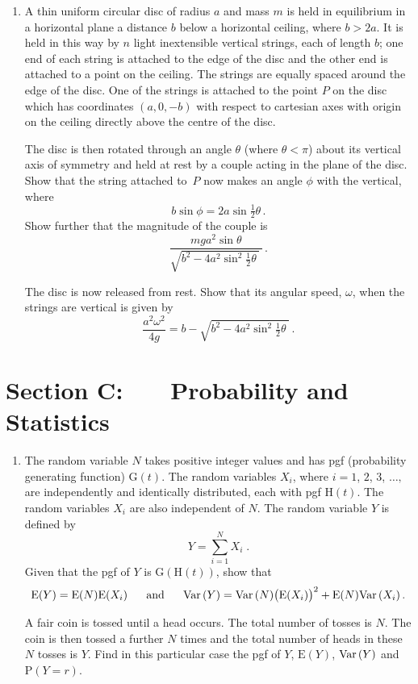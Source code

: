 \documentclass[a4, 11pt]{report}
\newlength{\qspace}
\newcounter{qnumber}
\newenvironment{question}%
 {\vspace{\qspace}
  \begin{enumerate}[\bfseries 1\quad][10]%
    \setcounter{enumi}{\value{qnumber}}%
    \item%
 }
{
  \end{enumerate}
  \filbreak
  \stepcounter{qnumber}
 }
\def\E{{\mathrm E}}
\def\G{{\mathrm G}}
\def\H{{\mathrm H}}
\def\P{{\mathrm P}}
\def\var{{\rm Var}\,}
\begin{document}

\begin{question}
A thin uniform circular disc of radius $a$ and mass $m$ is held
in equilibrium in a horizontal plane a distance $b$ below a horizontal
ceiling, where $b>2a$. It is held in this way by $n$ light
inextensible vertical strings, each of length $b$; one end of 
each string is attached to the edge of the disc and the other end is
attached to a point on the ceiling. The strings are equally 
spaced around the edge of the disc.
One of the strings is attached to the point $P$ on the disc
which has coordinates
$(a,0,-b)$ with respect to 
cartesian axes with origin on the ceiling directly above the
centre of the disc.


The disc is then rotated through an angle $\theta$ (where $\theta<\pi$)
about its vertical axis of symmetry and held at rest by a couple
acting in the plane of the disc.
Show that the  string attached to~$P$ now makes an angle $\phi$
with the vertical,
where
\[
b\sin\phi = 2a \sin\tfrac12 \theta\,.
\]
Show further that the magnitude of the couple is
\[
\frac {mga^2\sin\theta}{\sqrt{b^2-4a^2\sin^2 \frac12\theta \ } \ }\,.
\]

The disc is now released from rest. Show that 
its angular speed, $\omega$, when the strings
are vertical is given by
\[
\frac{a^2\omega^2}{4g} = b-\sqrt{b^2 - 4a^2\sin^2 \tfrac12\theta \;}\,.
\]
\end{question}
	

	
	\newpage
\section*{Section C: \ \ \ Probability and Statistics}


\begin{question}
The random variable $N$ takes positive integer values
and has pgf (probability generating function) $\G(t)$.
The random variables $X_i$, where $i=1$, $2$, $3$, $\ldots,$
 are independently and identically 
distributed, each  with pgf ${\H}(t)$. The random variables $X_i$
are also independent of $N$. The random variable $Y$ is defined by 
\[
Y=
\sum_{i=1}^N X_i \;.
\] 
Given  that the pgf of $Y$ is $\G(\H(t))$, 
show that  
\[
\E(Y) = \E(N)\E(X_i)
\text{ \ \ \ \ and \ \ \ \ }
\var(Y) = \var(N)\big(\E(X_i)\big)^2 + \E(N) \var(X_i)
\,.\]

A fair coin is tossed until a head occurs. The total number of tosses is
$N$. The coin is then tossed a further $N$ times and the total number of
heads in these $N$ tosses is $Y$. Find in this particular case 
the pgf of $Y$, $\E(Y)$, $\var(Y)$ and $\P(Y=r)$.
\end{question}
\end{document}
